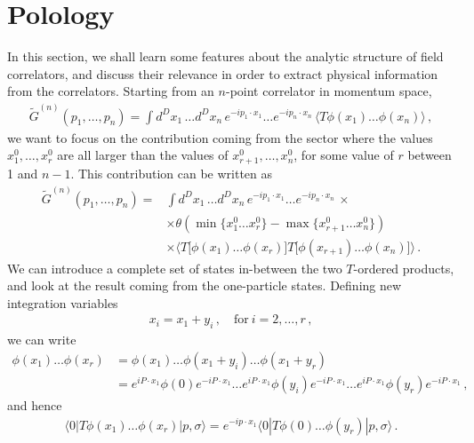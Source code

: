 \section{Polology}
\label{sec:polology}

In this section, we shall learn some features about the analytic
structure of field correlators, and discuss their relevance in order
to extract physical information from the correlators. Starting from an
$n$-point correlator in momentum space,
\begin{align}
  \tilde{G}^{(n)}\left(p_1, \ldots, p_n\right) 
  = \int d^Dx_1\, \ldots d^Dx_n\, 
  e^{-i p_1\cdot x_1} \ldots e^{-i p_n\cdot x_n}\, 
  \langle T\phi(x_1) \ldots \phi(x_n)\rangle\, ,
\end{align}
we want to focus on the contribution coming from the sector where the
values $x_1^0, \ldots, x_r^0$ are all larger than the values of
$x_{r+1}^0, \ldots, x_n^0$, for some value of $r$ between 1 and
$n-1$. This contribution can be written as 
\begin{align}
  \tilde{G}^{(n)}\left(p_1, \ldots, p_n\right) 
  =& \int d^Dx_1\, \ldots d^Dx_n\, 
  e^{-i p_1\cdot x_1} \ldots e^{-i p_n\cdot x_n}\, \times \nonumber \\
   &\times \theta\left(
     \min\{x_1^0 \ldots x_r^0\} - \max\{x_{r+1}^0 \ldots x_n^0\}
     \right) \nonumber \\
   &\times \langle T\Big[\phi(x_1) \ldots \phi(x_r)\Big]
     T\Big[\phi(x_{r+1}) \ldots \phi(x_n)\Big]
     \rangle\, .
\end{align}
We can introduce a complete set of states in-between the two
$T$-ordered products, and look at the result coming from the
one-particle states. Defining new integration variables
\begin{align}
  x_i = x_1 + y_i\, , \quad \mathrm{for}\ i=2, \ldots, r\, ,
\end{align}
we can write
\begin{align}
  \phi(x_1) \ldots \phi(x_r) 
  &= \phi(x_1) \ldots \phi(x_1+y_i) \ldots \phi(x_1+y_r) \nonumber \\
  &= e^{i P\cdot x_1} \phi(0) e^{-i P\cdot x_1} \ldots e^{i P\cdot
    x_1} \phi(y_i) e^{-i P\cdot x_1} \ldots e^{i P\cdot x_1} \phi(y_r)
    e^{-i P\cdot x_1}\, ,
\end{align}
and hence
\begin{align}
  \langle 0| T \phi(x_1) \ldots \phi(x_r) | p,\sigma\rangle = 
  e^{-i p \cdot x_1}  \langle 0| T \phi(0) \ldots \phi(y_r) |
  p,\sigma\rangle\, .
\end{align}
